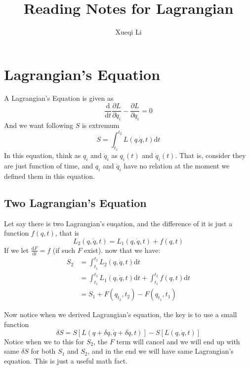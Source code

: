\documentclass{article}
\newcommand{\de}{\mathrm{d}}
\begin{document}
\title{Reading Notes for Lagrangian}
\author{Xueqi Li}


\maketitle

\section{Lagrangian's Equation}
A Lagrangian's Equation is given as
\[
\frac{\de}{\de t} \frac{\partial L}{\partial \dot{q}_i} - \frac{\partial L}{\partial q_i} = 0
\]
And we want following $S$ is extremum
\[
S = \int_{t_1}^{t_2} L(q.\dot q, t) \de t
\]
In this equation, think as $q_i$ and $\dot{q}_i$ as $q_i(t)$ and $\dot{q}_i(t)$. That is, consider they are just function of time, and $q_i$ and $\dot{q}_i$ have no relation at the moment we defined them in this equation.

\subsection{Two Lagrangian's Equation}
Let say there is two Lagrangian's euqation, and the difference of it is just a function $f(q,t)$, that is
\[
L_2 (q,\dot{q}, t)= L_1(q,\dot q, t)+ f(q,t) 
\]
If we let $\frac{\de F}{\de t} = f$ (if such $F$ exist). now that we have:
\begin{align*}
    S_2 &= \int_{t_1}^{t_2} L_2 (q,\dot{q}, t) \de t \\
        &= \int_{t_1}^{t_2}L_1(q,\dot q, t)\de t+ \int_{t_1}^{t_2}f(q,t)\de t \\
        &= S_1 + F(q_{t_2},t_2) - F(q_{t_1},t_1)
\end{align*}

Now notice when we derived Lagrangian's equation, the key is to use a small function 
\[
\delta S = S[L(q+\delta q, \dot q + \delta \dot q, t)] - S[L(q,\dot q, t)]
\] 
Notice when we to this for $S_2$, the $F$ term will cancel and we will end up with same $\delta S$ for both $S_1$ and $S_2$, and in the end we will have same Lagrangian's equation. This is just a useful math fact.
\end{document}
